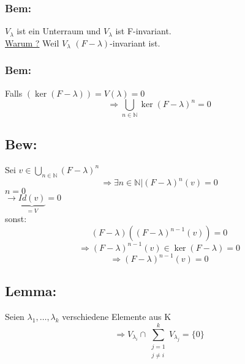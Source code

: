 \documentclass[titlepage,12pt,a4paper,ngerman]{report}
\newcommand{\ub}[1]{\underbrace{#1}}
\begin{document}
\subsubsection{Bem:}
$V_\lambda$ ist ein Unterraum und $V_\lambda$ ist F-invariant.\\
\underline{Warum ?} Weil $V_\lambda$ $(F-\lambda)$-invariant ist.
\subsubsection{Bem:}Falls $(\ker(F-\lambda))= V(\lambda) = 0$
$$\Rightarrow \bigcup_{n\in \mathbb{N}} \ker(F-\lambda)^n = 0$$
\subsection{Bew:}
Sei $v \in \bigcup_{n \in \mathbb{N}}(F-\lambda)^n$
$$\Rightarrow \exists n \in \mathbb{N} | (F-\lambda)^n(v) = 0$$
$n=0$\\
$\rightarrow \ub{Id(v)}_{=V} = 0$\\
sonst: $$(F-\lambda)((F-\lambda)^{n-1}(v)) = 0$$
$$\Rightarrow (F-\lambda)^{n-1}(v) \in \ker(F-\lambda) = 0$$
$$\Rightarrow (F-\lambda)^{n-1}(v) = 0$$
\subsection{Lemma:}
Seien $\lambda_1,\dots, \lambda_k$ verschiedene Elemente aus K
$$\Rightarrow V_{\lambda_i} \cap \sum^k_{\substack{ j=1 \\ j \neq i}} V_{\lambda_j} = \{0\}$$
\end{document}
